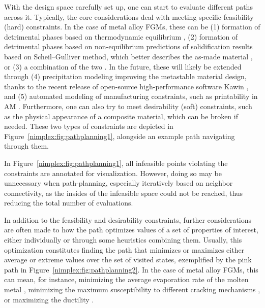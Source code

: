 With the design space carefully set up, one can start to evaluate different paths across it. Typically, the core considerations deal with meeting specific feasibility (hard) constraints. In the case of metal alloy FGMs, these can be (1) formation of detrimental phases based on thermodynamic equilibrium \cite{Reichardt2021AdvancesMaterials}, (2) formation of detrimental phases based on non-equilibrium predictions of solidification results based on Scheil–Gulliver method, which better describes the as-made material \cite{Bocklund2020ExperimentalMaterials}, or (3) a combination of the two \cite{Bobbio2022DesignCompositions}. In the future, these will likely be extended through (4) precipitation modeling improving the metastable material design, thanks to the recent release of open-source high-performance software Kawin \cite{Ury2023Kawin:Model}, and (5) automated modeling of manufacturing constraints, such as printability in AM \cite{SheikhAnAlloys}. Furthermore, one can also try to meet desirability (soft) constraints, such as the physical appearance of a composite material, which can be broken if needed. These two types of constraints are depicted in Figure~\ref{nimplex:fig:pathplanning1}, alongside an example path navigating through them.

In Figure~\ref{nimplex:fig:pathplanning1}, all infeasible points violating the constraints are annotated for visualization. However, doing so may be unnecessary when path-planning, especially iteratively based on neighbor connectivity, as the insides of the infeasible space could not be reached, thus reducing the total number of evaluations. 


In addition to the feasibility and desirability constraints, further considerations are often made to how the path optimizes values of a set of properties of interest, either individually or through some heuristics combining them. Usually, this optimization constitutes finding the path that minimizes or maximizes either average or extreme values over the set of visited states, exemplified by the pink path in Figure~\ref{nimplex:fig:pathplanning2}. In the case of metal alloy FGMs, this can mean, for instance, minimizing the average evaporation rate of the molten metal \cite{Mukherjee2016PrintabilityManufacturing}, minimizing the maximum susceptibility to different cracking mechanisms \cite{Yang2023DesignCracking}, or maximizing the ductility \cite{Hu2021ScreeningAlloys}.

